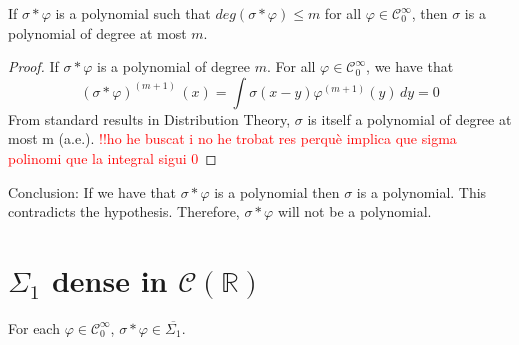 \documentclass[../main.tex]{subfiles}
\begin{document}
	\begin{lema} %
		If $\sigma \ast \varphi$ is a polynomial such that $ deg (\sigma \ast \varphi) \leq m$ for all $\varphi \in \mathcal{C}^\infty_0$, then $\sigma$ is a polynomial of degree at most $m$.
	\end{lema}
	\begin{proof} 
	If $\sigma \ast \varphi$ is a polynomial of degree $m$.
	For all $\varphi \in \mathcal{C}^\infty_0$, we have that
	$$(\sigma \ast \varphi)^{(m+1)} \, (x)=\int \sigma(x-y)\varphi^{(m+1)}(y) \, dy= 0$$  
	From standard results in Distribution Theory, $\sigma $ is itself a polynomial of degree at most m (a.e.).  \textcolor{red}{!!ho he buscat i no he trobat res perquè implica que sigma polinomi que la integral sigui 0}
	\end{proof} 
\noindent Conclusion: If we have that $\sigma \ast \varphi$ is a polynomial then $\sigma$ is a polynomial. This contradicts the hypothesis. Therefore, $\sigma \ast \varphi$ will not be a polynomial. 

\section{$\Sigma_1$ dense in $\mathcal{C}(\mathbb{R})$}

	\begin{lema} %
		For each $\varphi \in  \mathcal{C}^\infty_0$, $ \sigma \ast \varphi \in  \overline{\Sigma_1}$. 
		
	\end{lema}
	
\end{document}
